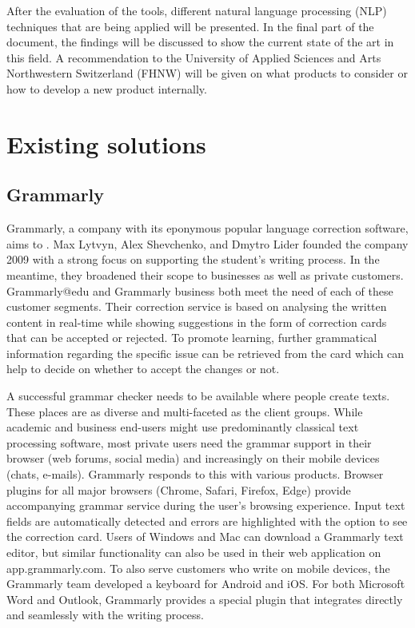 \documentclass[runningheads]{llncs}
\let\OldTextregistered\textregistered
\renewcommand{\textregistered}{\OldTextregistered\xspace}
\begin{document}
After the evaluation of the tools, different natural language processing (NLP) techniques that are being applied will be presented. In the final part of the document, the findings will be discussed to show the current state of the art in this field. A recommendation to the University of Applied Sciences and Arts Northwestern Switzerland (FHNW) will be given on what products to consider or how to develop a new product internally.


\section{Existing solutions}
\subsection{Grammarly\textregistered}
Grammarly\textregistered, a company with its eponymous popular language correction software, aims to . Max Lytvyn, Alex Shevchenko, and Dmytro Lider founded the company 2009 with a strong focus on supporting the student's writing process. In the meantime, they broadened their scope to businesses as well as private customers. Grammarly\textregistered @edu and Grammarly\textregistered business both meet the need of each of these customer segments. Their correction service is based on analysing the written content in real-time while showing suggestions in the form of correction cards that can be accepted or rejected. To promote learning, further grammatical information regarding the specific issue can be retrieved from the card which can help to decide on whether to accept the changes or not. \citep{noauthor_grammarly_nodate}

A successful grammar checker needs to be available where people create texts. These places are as diverse and multi-faceted as the client groups. While academic and business end-users might use predominantly classical text processing software, most private users need the grammar support in their browser (web forums, social media) and increasingly on their mobile devices (chats, e-mails). Grammarly\textregistered responds to this with various products. Browser plugins for all major browsers (Chrome, Safari, Firefox, Edge) provide accompanying grammar service during the user's browsing experience. Input text fields are automatically detected and errors are highlighted with the option to see the correction card. Users of Windows and Mac can download a Grammarly\textregistered text editor, but similar functionality can also be used in their web application on app.grammarly.com. To also serve customers who write on mobile devices, the Grammarly\textregistered team developed a keyboard for Android and iOS. For both Microsoft Word and Outlook, Grammarly\textregistered provides a special plugin that integrates directly and seamlessly with the writing process.
\end{document}
